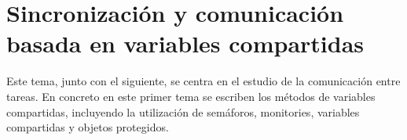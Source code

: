 \section{Sincronización y comunicación basada en variables compartidas}

Este tema, junto con el siguiente, se centra en el estudio de la comunicación
entre tareas. En concreto en este primer tema se escriben los métodos de
variables compartidas, incluyendo la utilización de semáforos, monitories,
variables compartidas y objetos protegidos.
